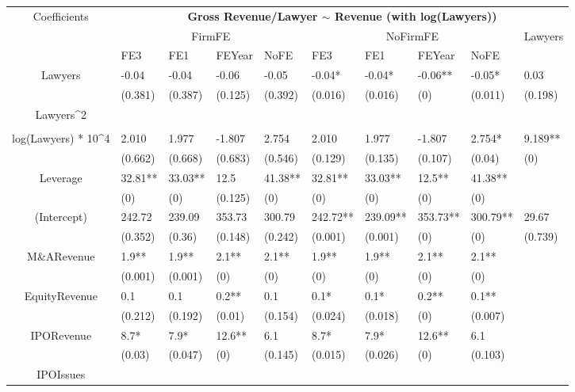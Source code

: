 \documentclass{article}
\begin{document}
\begin{table}[H]
\centering
\begin{tabular}{|clllllllll|}
\hline
\multirow{3}{*}{Coefficients} & \multicolumn{9}{c|}{\textbf{Gross Revenue/Lawyer $\sim$ Revenue (with log(Lawyers))}} \\
\cline{2-10}
& \multicolumn{4}{c}{FirmFE} & \multicolumn{4}{c}{NoFirmFE} & \multirow{2}{*}{Lawyers} \\
\cline{2-9}
& FE3 & FE1 & FEYear & NoFE & FE3 & FE1 & FEYear & NoFE &  \\
\hline
 
Lawyers & -0.04 & -0.04 & -0.06 & -0.05 & -0.04* & -0.04* & -0.06** & -0.05* & 0.03 \\ 
   & (0.381) & (0.387) & (0.125) & (0.392) & (0.016) & (0.016) & (0) & (0.011) & (0.198) \\ 
  Lawyers^2 &  &  &  &  &  &  &  &  &  \\ 
   &  &  &  &  &  &  &  &  &  \\ 
  log(Lawyers) * 10^4 & 2.010 & 1.977 & -1.807 & 2.754 & 2.010 & 1.977 & -1.807 & 2.754* & 9.189** \\ 
   & (0.662) & (0.668) & (0.683) & (0.546) & (0.129) & (0.135) & (0.107) & (0.04) & (0) \\ 
  Leverage & 32.81** & 33.03** & 12.5 & 41.38** & 32.81** & 33.03** & 12.5** & 41.38** &  \\ 
   & (0) & (0) & (0.125) & (0) & (0) & (0) & (0) & (0) &  \\ 
  (Intercept) & 242.72 & 239.09 & 353.73 & 300.79 & 242.72** & 239.09** & 353.73** & 300.79** & 29.67 \\ 
   & (0.352) & (0.36) & (0.148) & (0.242) & (0.001) & (0.001) & (0) & (0) & (0.739) \\ 
  M\&ARevenue & 1.9** & 1.9** & 2.1** & 2.1** & 1.9** & 1.9** & 2.1** & 2.1** &  \\ 
   & (0.001) & (0.001) & (0) & (0) & (0) & (0) & (0) & (0) &  \\ 
  EquityRevenue & 0.1 & 0.1 & 0.2** & 0.1 & 0.1* & 0.1* & 0.2** & 0.1** &  \\ 
   & (0.212) & (0.192) & (0.01) & (0.154) & (0.024) & (0.018) & (0) & (0.007) &  \\ 
  IPORevenue & 8.7* & 7.9* & 12.6** & 6.1 & 8.7* & 7.9* & 12.6** & 6.1 &  \\ 
   & (0.03) & (0.047) & (0) & (0.145) & (0.015) & (0.026) & (0) & (0.103) &  \\ 
  IPOIssues &  &  &  &  &  &  &  &  &  \\ 

\end{tabular}
\end{table}
\end{document}
